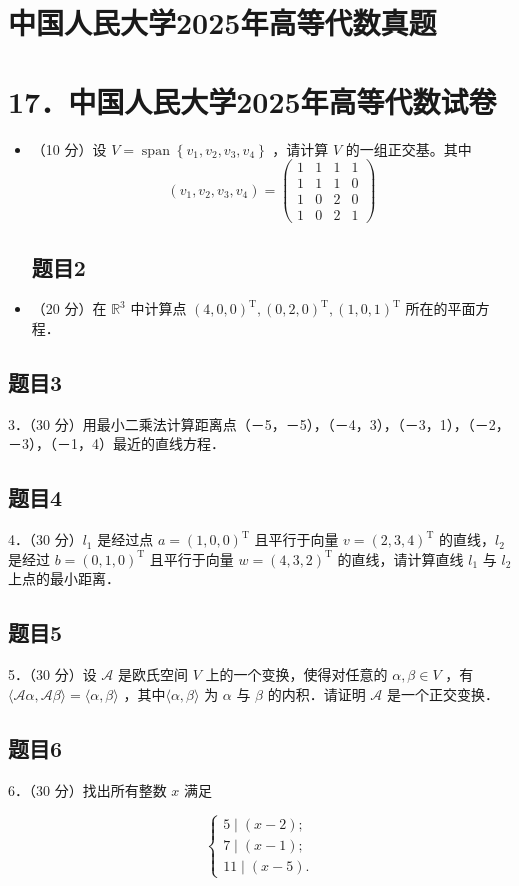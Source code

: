 \documentclass{article}
\begin{document}
\section*{中国人民大学2025年高等代数真题}
\section*{17．中国人民大学2025年高等代数试卷}
\begin{itemize}

\subsection{题目1}
  \item[1．] （10 分）设 \(V=\operatorname{span}\left\{v_{1}, v_{2}, v_{3}, v_{4}\right\}\) ，请计算 \(V\) 的一组正交基。其中
\[
\left(v_{1}, v_{2}, v_{3}, v_{4}\right)=\left(\begin{array}{llll}
1 & 1 & 1 & 1 \\
1 & 1 & 1 & 0 \\
1 & 0 & 2 & 0 \\
1 & 0 & 2 & 1
\end{array}\right)
\]

\subsection{题目2}
  \item[2．] （20 分）在 \(\mathbb{R}^{3}\) 中计算点 \((4,0,0)^{\mathrm{T}},(0,2,0)^{\mathrm{T}},(1,0,1)^{\mathrm{T}}\) 所在的平面方程．
\end{itemize}

\subsection{题目3}
3．（30 分）用最小二乘法计算距离点（－5，－5），（－4，3），（－3，1），（－2，－3），（－1，4）最近的直线方程．

\subsection{题目4}
4．（30 分）\(l_{1}\) 是经过点 \(a=(1,0,0)^{\mathrm{T}}\) 且平行于向量 \(v=(2,3,4)^{\mathrm{T}}\) 的直线，\(l_{2}\) 是经过 \(b=(0,1,0)^{\mathrm{T}}\) 且平行于向量 \(w=(4,3,2)^{\mathrm{T}}\) 的直线，请计算直线 \(l_{1}\) 与 \(l_{2}\) 上点的最小距离．

\subsection{题目5}
5．（30 分）设 \(\mathcal{A}\) 是欧氏空间 \(V\) 上的一个变换，使得对任意的 \(\alpha, \beta \in V\) ，有 \(\langle\mathcal{A} \alpha, \mathcal{A} \beta\rangle=\langle\alpha, \beta\rangle\) ，其中\(\langle\alpha, \beta\rangle\) 为 \(\alpha\) 与 \(\beta\) 的内积．请证明 \(\mathcal{A}\) 是一个正交变换．

\subsection{题目6}
6．（30 分）找出所有整数 \(x\) 满足

\[
\left\{\begin{array}{l}
5 \mid(x-2) ; \\
7 \mid(x-1) ; \\
11 \mid(x-5) .
\end{array}\right.
\]
\end{document}
